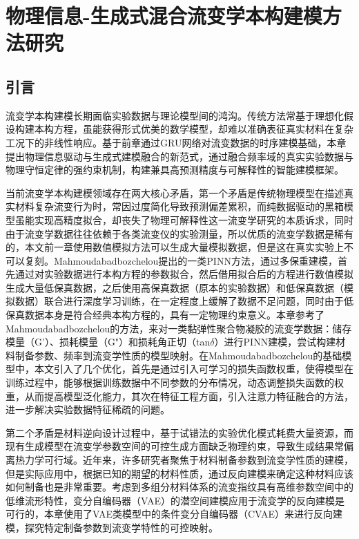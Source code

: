 \chapter{物理信息-生成式混合流变学本构建模方法研究}
\section{引言}
流变学本构建模长期面临实验数据与理论模型间的鸿沟。传统方法常基于理想化假设构建本构方程，虽能获得形式优美的数学模型，却难以准确表征真实材料在复杂工况下的非线性响应。基于前章通过GRU网络对流变数据的时序建模基础，本章提出物理信息驱动与生成式建模融合的新范式，通过融合频率域的真实实验数据与物理守恒定律的强约束机制，构建兼具高预测精度与可解释性的智能建模框架。

当前流变学本构建模领域存在两大核心矛盾，第一个矛盾是传统物理模型在描述真实材料复杂流变行为时，常因过度简化导致预测偏差累积，而纯数据驱动的黑箱模型虽能实现高精度拟合，却丧失了物理可解释性这一流变学研究的本质诉求，同时由于流变学数据往往依赖于各类流变仪的实验测量，所以优质的流变学数据是稀有的，本文前一章使用数值模拟方法可以生成大量模拟数据，但是这在真实实验上不可以复刻。Mahmoudabadbozchelou提出的一类PINN方法，通过多保重建模，首先通过对实验数据进行本构方程的参数拟合，然后借用拟合后的方程进行数值模拟生成大量低保真数据，之后使用高保真数据（原本的实验数据）和低保真数据（模拟数据）联合进行深度学习训练，在一定程度上缓解了数据不足问题，同时由于低保真数据本身是符合经典本构方程的，具有一定物理约束意义。本章参考了Mahmoudabadbozchelou的方法，来对一类黏弹性聚合物凝胶的流变学数据：储存模量（G'）、损耗模量（G"）和损耗角正切（tan$\delta$）进行PINN建模，尝试构建材料制备参数、频率到流变学性质的模型映射。在Mahmoudabadbozchelou的基础模型中，本文引入了几个优化，首先是通过引入可学习的损失函数权重，使得模型在训练过程中，能够根据训练数据中不同参数的分布情况，动态调整损失函数的权重，从而提高模型泛化能力，其次在特征工程方面，引入注意力特征融合的方法，进一步解决实验数据特征稀疏的问题。

第二个矛盾是材料逆向设计过程中，基于试错法的实验优化模式耗费大量资源，而现有生成模型在流变学参数空间的可控生成方面缺乏物理约束，导致生成结果常偏离热力学可行域。近年来，许多研究者聚焦于材料制备参数到流变学性质的建模，但是实际应用中，根据已知的期望的材料性质，通过反向建模来确定这种材料应该如何制备也是非常重要。考虑到多组分材料体系的流变指纹具有高维参数空间中的低维流形特性，变分自编码器（VAE）的潜空间建模应用于流变学的反向建模是可行的，本章使用了VAE类模型中的条件变分自编码器（CVAE）来进行反向建模，探究特定制备参数到流变学特性的可控映射。

